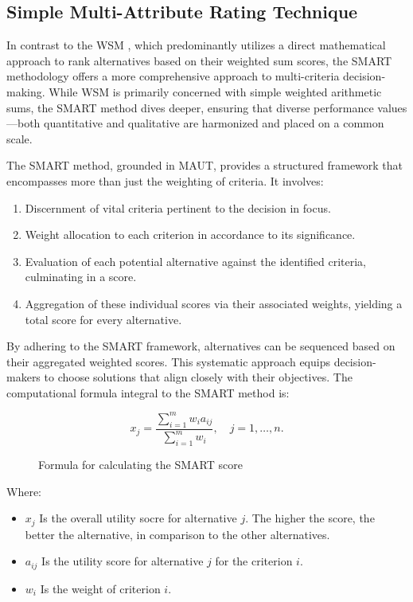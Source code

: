 \subsection{Simple Multi-Attribute Rating Technique}

In contrast to the \ac{WSM} , which predominantly utilizes a
direct mathematical approach to rank alternatives based on their weighted sum
scores, the \ac{SMART} methodology offers a more comprehensive approach to
multi-criteria decision-making. While \ac{WSM} is primarily concerned with simple
weighted arithmetic sums, the \ac{SMART} method dives deeper, ensuring that diverse
performance values—both quantitative and qualitative are harmonized and placed
on a common scale.

The \ac{SMART} method, grounded in \ac{MAUT}, provides a
structured framework that encompasses more than just the weighting of criteria.
It involves:

\begin{enumerate} \item Discernment of vital criteria pertinent to the decision
in focus. \item Weight allocation to each criterion in accordance to its
significance. \item Evaluation of each potential alternative against the
identified criteria, culminating in a score. \item Aggregation of these
individual scores via their associated weights, yielding a total score for every
alternative. \end{enumerate}

By adhering to the \ac{SMART} framework, alternatives can be sequenced based on
their aggregated weighted scores. This systematic approach equips
decision-makers to choose solutions that align closely with their objectives.
The computational formula integral to the \ac{SMART} method is:


\begin{figure}[h]
    \centering
    \Large
    \[ x_j = \frac{\sum_{i=1}^{m} w_i a_{ij}}{\sum_{i=1}^{m} w_i}, \quad j = 1, \ldots, n. \]
    \caption{Formula for calculating the \ac*{SMART} score\protect\footnotemark} 
\end{figure}


Where:
\begin{itemize}
    \item \( x_j \) Is the overall utility socre for alternative \( j \). The higher the score, the better the alternative, in comparison to the other alternatives.
    \item \( a_{ij} \)  Is the utility score for alternative \( j \) for the criterion \( i \).
    \item \( w_i \) Is the weight of criterion \( i \).
\end{itemize}

